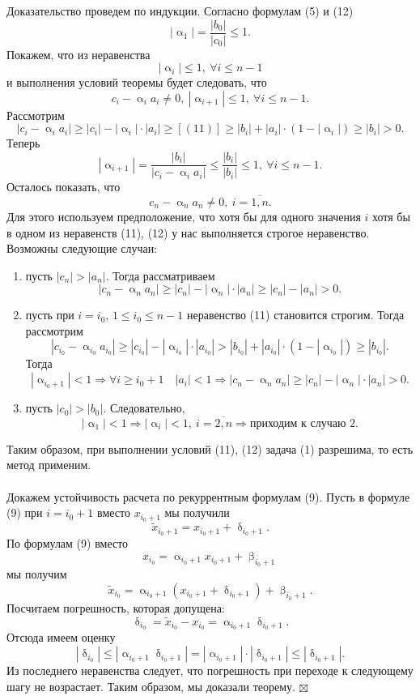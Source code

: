 \documentclass[a4paper, 12pt]{report}
\newenvironment{Proof} %
{\par\noindent{$\blacklozenge$}} %
{\hfill$\scriptstyle\boxtimes$}
\renewcommand{\leq}{\leqslant}
\renewcommand{\geq}{\geqslant}
\renewcommand{\alpha}{\upalpha}
\renewcommand{\beta}{\upbeta}
\renewcommand{\delta}{\updelta}
\begin{document}
	\begin{Proof}
		Доказательство проведем по индукции. Согласно формулам (5) и (12) $$|\alpha_1| = \dfrac{|b_0|}{|c_0|}\leq 1.$$
		Покажем, что из неравенства $$|\alpha_i|\leq 1,\ \forall i \leq n-1$$
		и выполнения условий теоремы будет следовать, что $$c_i - \alpha_i a_i \ne 0,
		\ |\alpha_{i+1}|\leq 1,\ \forall i \leq n-1.$$
		Рассмотрим $$|c_i - \alpha_i a_i| \geq |c_i| - |\alpha_i|\cdot |a_i|\geq [(11)]\geq |b_i| + |a_i|\cdot (1-|\alpha_i|)\geq |b_i|>0.$$
		Теперь $$|\alpha_{i+1}| = \dfrac{|b_i|}{|c_i-\alpha_i a_i|}\leq \dfrac{|b_i|}{|b_i|}\leq 1,\ \forall i \leq n-1.$$
		Осталось показать, что $$c_n - \alpha_n a_n \ne 0,\ i =\overline{1, n}.$$
		Для этого используем предположение, что хотя бы для одного значения $i$ хотя бы в одном из неравенств (11), (12) у нас выполняется строгое неравенство. Возможны следующие случаи:\begin{enumerate}
			\item пусть $|c_n| > |a_n|$. Тогда рассматриваем $$|c_n - \alpha_n a_n|\geq |c_n| - |\alpha_n|\cdot |a_n|\geq |c_n| - |a_n|>0.$$
			\item пусть при $i = i_0$, $1 \leq i_0\leq n-1$ неравенство (11) становится строгим. Тогда рассмотрим $$|c_{i_0} - \alpha_{i_0}a_{i_0}| \geq |c_{i_0}| - | \alpha_{i_0}|\cdot |a_{i_0}| > |b_{i_0}| + |a_{i_0}|\cdot (1-|\alpha_{i_0}|)\geq |b_{i_0}|.$$
			Тогда $$|\alpha_{i_0+1}|<1 \Rightarrow \forall i \geq i_0 + 1\quad |a_i| < 1 \Rightarrow | c_n - \alpha_n a_n| \geq |c_n| - |\alpha_n|\cdot |a_n| > 0.$$
			\item пусть $|c_0|>|b_0|$. Следовательно, $$|\alpha_1| < 1 \Rightarrow |\alpha_i| < 1,\ i =\overline{2,n} \Rightarrow \text{приходим к случаю 2}.$$
		\end{enumerate}
		Таким образом, при выполнении условий (11), (12) задача (1) разрешима, то есть метод применим.\\\\
		Докажем устойчивость расчета по рекуррентным формулам (9). Пусть в формуле (9) при $i = i_0 + 1$ вместо $x_{i_0 + 1}$ мы получили $$\widetilde{x}_{i_0 + 1} = x_{i_0 + 1} + \delta_{i_0 + 1}.$$
		По формулам (9) вместо $$x_{i_0} = \alpha_{i_0 + 1} x_{i_0 + 1} + \beta_{i_0 + 1}$$ мы получим $$\widetilde{x}_{i_0} = \alpha_{i_0 + 1}( x_{i_0 + 1} + \delta_{i_0 + 1}) + \beta_{i_0 + 1}.$$
		Посчитаем погрешность, которая допущена:
		$$\delta_{i_0} = \widetilde{x}_{i_0} - x_{i_0} = \alpha_{i_0+1}\delta_{i_0+1}.$$
		Отсюда имеем оценку $$|\delta_{i_0}|\leq |\alpha_{i_0 + 1}\delta_{i_0+1}|=|\alpha_{i_0 + 1}|\cdot  |\delta_{i_0+1}|\leq |\delta_{i_0+1}|.$$
		Из последнего неравенства следует, что погрешность при переходе к следующему шагу не возрастает. Таким образом, мы доказали теорему.
	\end{Proof}\\\\
\end{document}
